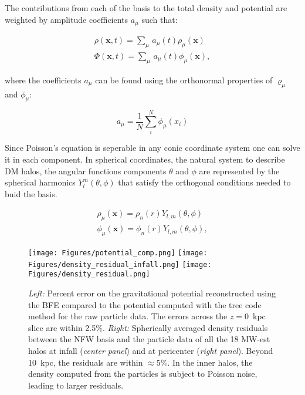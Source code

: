 \documentclass[twocolumn, linenumbers]{openjournal}
\begin{document}
The contributions from each of the basis to the total density and potential are 
weighted by amplitude coefficients $a_{\mu}$ such that:

\begin{equation}\label{eq:fields}
    \begin{split}
    \rho(\textbf{x}, t) = \sum_{\mu}\,a_{\mu}(t) \rho_{\mu}(\textbf{x}) \\
    \Phi(\textbf{x}, t) = \sum_{\mu}\,a_{\mu}(t) \phi_{\mu}(\textbf{x}),
    \end{split}
\end{equation}

where the coefficients $a_{\mu}$ can be found using the orthonormal properties of $\varrho_{\mu}$ 
and $\phi_{\mu}$: 

\begin{equation}\label{eq:coefficients}
    a_{{\mu}} = \dfrac{1}{N} \sum_{i}^{N} \phi_{\mu} (x_{i})  
\end{equation}

Since Poisson's equation is seperable in any conic coordinate system one
can solve it in each component. In spherical coordinates, the natural system to describe DM halos, 
the angular functions components $\theta$ and $\phi$ are represented by the spherical 
harmonics $Y_{l}^{m}(\theta, \phi)$ that satisfy the orthogonal conditions needed to buid the basis.

\begin{equation}
    \begin{split}
    \rho_{\mu}(\textbf{x}) = \rho_{n}(r) Y_{l,m}(\theta, \phi)\\
    \phi_{\mu}(\textbf{x}) = \phi_{n}(r) Y_{l,m}(\theta, \phi),
    \end{split}
\end{equation}


\begin{figure*}[h]
    \centering
    \texttt{[image: Figures/potential\_comp.png]}
    \texttt{[image: Figures/density\_residual\_infall.png]}
    \texttt{[image: Figures/density\_residual.png]}
    \caption[Comparison Between Particle Data and Reconstruction]{\emph{Left:} Percent error 
    on the gravitational potential reconstructed using the BFE compared to the potential 
    computed with the tree code method for the raw particle data. The errors across the 
    $z=0$~kpc slice are within 2.5\%. \emph{Right:} Spherically averaged density residuals 
    between the NFW basis and the particle data of all the 18 MW-est halos at infall 
    (\textit{center panel}) and at pericenter (\textit{right panel}).  Beyond 10~kpc, 
    the residuals are within $\approx 5\%$. In the inner halos, the density computed from 
    the particles is subject to Poisson noise, leading to larger residuals.}\label{fig:dens_residuals}
\end{figure*}
\end{document}
